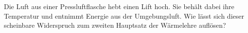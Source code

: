 Die Luft aus einer Pressluftflasche hebt einen Lift hoch. Sie behält dabei ihre Temperatur und entnimmt Energie aus der Umgebungsluft. Wie lässt sich dieser scheinbare Widerspruch zum zweiten Hauptsatz der Wärmelehre auflösen?
